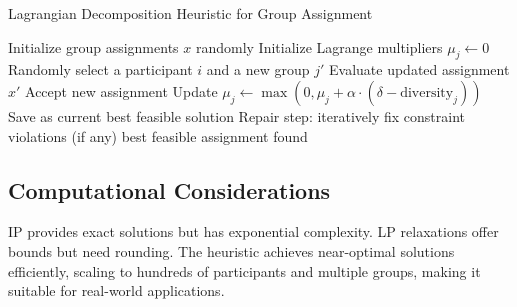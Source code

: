 \begin{algorithm}[H]
\caption*{Lagrangian Decomposition Heuristic for Group Assignment}
\begin{algorithmic}[1]
\State Initialize group assignments $x$ randomly
\State Initialize Lagrange multipliers $\mu_j \gets 0$
        \State Randomly select a participant $i$ and a new group $j'$
            \State Evaluate updated assignment $x'$
                \State Accept new assignment
            \EndIf
        \EndIf
    \EndFor
        \State Update $\mu_j \gets \max(0, \mu_j + \alpha \cdot (\delta - \text{diversity}_j))$
    \EndFor
        \State Save as current best feasible solution
    \EndIf
\EndFor
\State Repair step: iteratively fix constraint violations (if any)
\State \Return best feasible assignment found
\end{algorithmic}
\end{algorithm}

\subsection*{Computational Considerations}
IP provides exact solutions but has exponential complexity. LP relaxations offer bounds but need rounding. The heuristic achieves near-optimal solutions efficiently, scaling to hundreds of participants and multiple groups, making it suitable for real-world applications.